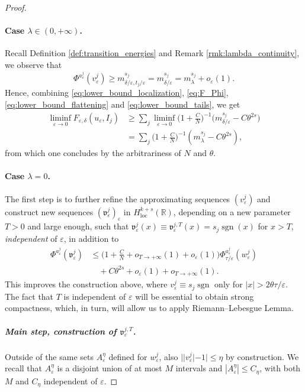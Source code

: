\documentclass{article}
\theoremstyle{definition}
\newcommand{\R}{\mathbb{R}}
\newcommand{\e}{\varepsilon}
\newcommand{\del}{\delta}
\def\e{\varepsilon}
\newcommand{\sgn}{\operatorname{sgn}}
\begin{document}
\begin{proof}
   \paragraph{Case $\lambda\in (0,+\infty)$.} Recall Definition \ref{def:transition_energies} and Remark \ref{rmk:lambda_continuity}, we observe that 
   \[\Phi^{a^{j}_{\scriptstyle\e}
             } (v_\e^j)\ge m^{ s_j}_{\del/\e, t_j/\e}= m^{ s_j}_{\del/\e} = m_\lambda^{s_j} + o_\e(1).\] 
Hence, combining \eqref{eq:lower_bound_localization}, \eqref{eq:F_Phi}, \eqref{eq:lower_bound_flattening} and \eqref{eq:lower_bound_tails}, we get
    \begin{equation*}
   \begin{split}
     \liminf_{\varepsilon\to 0}   F_{\e,\del}(u_\e, I_j)&\ge \sum_j\liminf_{\varepsilon\to 0}\Big(1+\frac{C}{N}\Big)^{-1}\big(m^{s_j}_{\delta/\e}- C\theta^{2s}\big) \\
     &=  \sum_j\Big(1+\frac{C}{N} \Big)^{-1}(m^{s_j}_\lambda- C\theta^{2s}  ),
   \end{split}
    \end{equation*}
from which one concludes by the arbitrariness of $N$ and $\theta$.

\paragraph{Case $\lambda = 0$.} 
The first step is to further refine the approximating sequences $(v^j_\e)$ and construct new sequences $(\mathfrak{v}^{j}_\e)_\e$ in $H^{k+s}_{\mathrm{loc}}(\R)$, 
depending on a new parameter $T>0$ and large enough,  such that $\mathfrak{v}^{j}_{\e}(x)\equiv \mathfrak{v}^{j, T}_{\e}(x)=s_j\sgn(x)$ for $x>T$, \emph{independent} of $\e$, in addition to
\begin{equation*}
        \begin{split}
             \Phi^{a^{j}_{\scriptstyle\e}}(\mathfrak{v}^{j}_{\e}) &\leq  \Big(1+\frac{C}{N}+o_{T\to +\infty}(1)+o_\e(1)\Big)\Phi^{a^{j}_{\scriptstyle\e}}_{\tau/ \e}(w_\e^j)\\
             &\quad+C\theta^{2s}+ o_\e(1)+ o_{T\to +\infty}(1).
        \end{split}
    \end{equation*}
This improves the construction above, where $v^j_\e\equiv s_j\sgn$  only for $|x|>2\theta\tau/\e$. The fact that $T$ is independent of $\e$ will be essential to obtain strong compactness, which, in turn, will allow us to apply Riemann--Lebesgue Lemma.

\subparagraph{Main step, construction of $\mathfrak{v}^{j, T}_\e$.}
Outside of the same sets $A_\e^\eta$ defined for $w^j_\e$, also  $||v^j_\e|-1|\leq \eta$ by construction. We recall that $A_\e^\eta$ is a disjoint union of at most $M$ intervals and $|A_\e^\eta|\leq C_\eta$, with both $M$ and $C_\eta$ independent of $\e$.


\end{proof}
\end{document}
